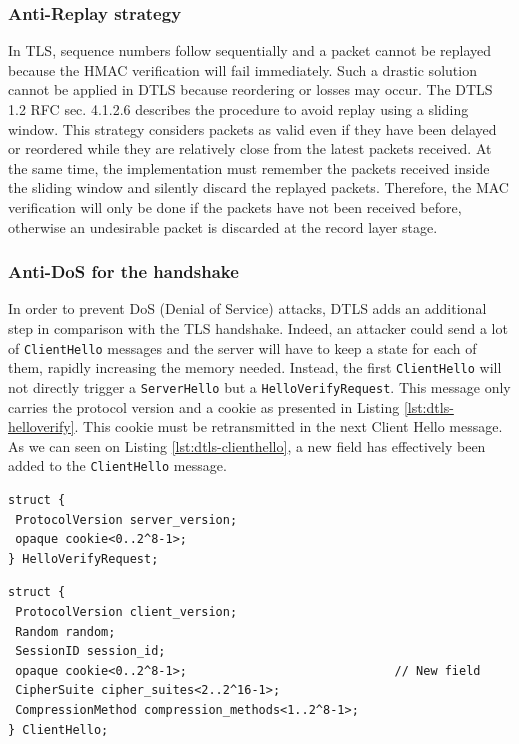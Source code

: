 \subsubsection{Anti-Replay strategy}

In TLS, sequence numbers follow sequentially and a packet cannot be replayed because the HMAC verification will fail immediately. Such a drastic solution cannot be applied in DTLS because reordering or losses may occur. The DTLS 1.2 RFC \cite{rfc6347} sec. 4.1.2.6 describes the procedure to avoid replay using a sliding window. This strategy considers packets as valid even if they have been delayed or reordered while they are relatively close from the latest packets received. At the same time, the implementation must remember the packets received inside the sliding window and silently discard the replayed packets. Therefore, the MAC verification will only be done if the packets have not been received before, otherwise an undesirable packet is discarded at the record layer stage.

\subsubsection{Anti-DoS for the handshake}

In order to prevent DoS (Denial of Service) attacks, DTLS adds an additional step in comparison with the TLS handshake. Indeed, an attacker could send a lot of \texttt{ClientHello} messages and the server will have to keep a state for each of them, rapidly increasing the memory needed. Instead, the first \texttt{ClientHello} will not directly trigger a \texttt{ServerHello} but a \texttt{HelloVerifyRequest}. This message only carries the protocol version and a cookie as presented in Listing \ref{lst:dtls-helloverify}. This cookie must be retransmitted in the next Client Hello message. As we can seen on Listing \ref{lst:dtls-clienthello}, a new field has effectively been added to the \texttt{ClientHello} message.

\begin{lstlisting}[caption=DTLS HelloVerifyRequest message, label=lst:dtls-helloverify]
struct {
 ProtocolVersion server_version;
 opaque cookie<0..2^8-1>;
} HelloVerifyRequest;
\end{lstlisting}


\begin{lstlisting}[caption=DTLS ClientHello adapted message, label=lst:dtls-clienthello]
struct {
 ProtocolVersion client_version;
 Random random;
 SessionID session_id;
 opaque cookie<0..2^8-1>;                             // New field
 CipherSuite cipher_suites<2..2^16-1>;
 CompressionMethod compression_methods<1..2^8-1>;
} ClientHello;
\end{lstlisting}

